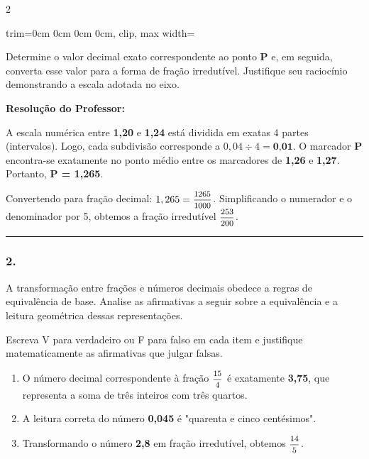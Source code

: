 \begin{multicols*}{2}
\begin{center}
\begin{adjustbox}{trim=0cm 0cm 0cm 0cm, clip, max width=\larguraTikz}
\end{adjustbox}
\end{center}

Determine o valor decimal exato correspondente ao ponto \textbf{P} e, em seguida, converta esse valor para a forma de fração irredutível. Justifique seu raciocínio demonstrando a escala adotada no eixo.

\ifgabarito
    \begin{tcolorbox}[colback=CorTitUm!5, colframe=CorTitUm, boxrule=1pt, arc=4pt, left=6pt, right=6pt, top=6pt, bottom=6pt]
    \small\textbf{\textcolor{CorTitUm}{Resolução do Professor:}}\par\vspace{0.1cm}
    \color{CinzaEscuro}
    A escala numérica entre \textbf{1,20} e \textbf{1,24} está dividida em exatas 4 partes (intervalos). Logo, cada subdivisão corresponde a $0,04 \div 4 = \textbf{0,01}$. O marcador \textbf{P} encontra-se exatamente no ponto médio entre os marcadores de \textbf{1,26} e \textbf{1,27}. Portanto, \textbf{P = 1,265}. 
    
    Convertendo para fração decimal: $1,265 = \mfrac{1265}{1000}$. Simplificando o numerador e o denominador por 5, obtemos a fração irredutível $\mfrac{253}{200}$.
    \end{tcolorbox}
\fi

\par\vspace{\espacoQuestao}

\noindent\textcolor{CorLinha}{\rule{\linewidth}{0.5pt}} 
\par\vspace{\espacoPreQuestao}
\subsubsection*{2.} A transformação entre frações e números decimais obedece a regras de equivalência de base. Analise as afirmativas a seguir sobre a equivalência e a leitura geométrica dessas representações.

Escreva V para verdadeiro ou F para falso em cada item e justifique matematicamente as afirmativas que julgar falsas.
\begin{enumerate}[label=\Roman*., itemsep=\espacoAlt]
    \item O número decimal correspondente à fração $ \mfrac{15}{4} $ é exatamente \textbf{3,75}, que representa a soma de três inteiros com três quartos.
    \item A leitura correta do número \textbf{0,045} é "quarenta e cinco centésimos".
    \item Transformando o número \textbf{2,8} em fração irredutível, obtemos $ \mfrac{14}{5} $.
\end{enumerate}


\end{multicols*}
